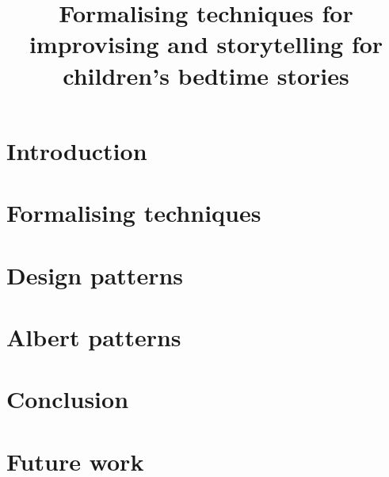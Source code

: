 \documentclass{tufte-handout}
\title{Formalising techniques for improvising and storytelling for children's bedtime stories}
\begin{document}
\maketitle
\section{Introduction}
\section{Formalising techniques}
\section{Design patterns}
\section{Albert patterns}
\section{Conclusion}
\section{Future work}
\end{document}
